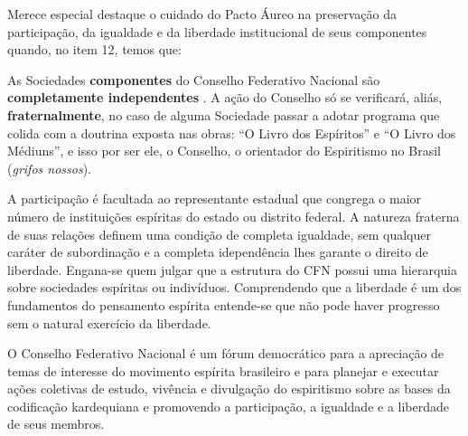 Merece especial destaque o cuidado do Pacto Áureo na preservação da participação, da igualdade e da liberdade institucional de seus componentes quando, no item 12, temos que:


\begin{citacao}
As Sociedades \textbf{componentes} do Conselho Federativo Nacional são \textbf{completamente independentes} . A ação do Conselho só se verificará, aliás, \textbf{fraternalmente}, no caso de alguma Sociedade passar a adotar programa que colida com a doutrina exposta nas obras: “O Livro dos Espíritos” e “O Livro dos Médiuns”, e isso por ser ele, o Conselho, o orientador do Espiritismo no Brasil (\emph{grifos nossos}).
\end{citacao}

A participação é facultada ao representante estadual que congrega o maior número de instituições espíritas do estado ou distrito federal. A natureza fraterna de suas relações definem uma condição de completa igualdade, sem qualquer caráter de subordinação e a completa idependência lhes garante o direito de liberdade. Engana-se quem julgar que a estrutura do CFN possui uma hierarquia sobre sociedades espíritas ou indivíduos. Comprendendo que a liberdade é um dos fundamentos do pensamento espírita entende-se que não pode haver progresso sem o natural exercício da liberdade.  

O Conselho Federativo Nacional é um fórum democrático para a apreciação de temas de interesse do movimento espírita brasileiro e para planejar e executar ações coletivas de estudo, vivência e divulgação do espiritismo sobre as bases da codificação kardequiana e promovendo a participação, a igualdade e a liberdade de seus membros. 

